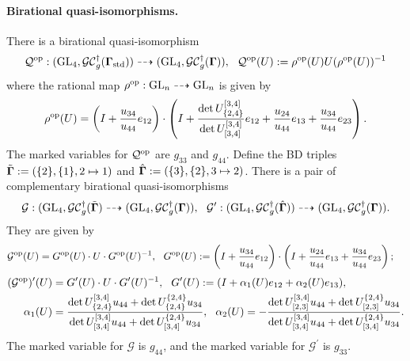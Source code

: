 \paragraph{Birational quasi-isomorphisms.} There is a birational quasi-isomorphism
\begin{equation}
    \mathcal{Q}^{\mathrm{op}}: (\operatorname{GL}_4,\mathcal{GC}_g^{\dagger}(\mathbf{\Gamma}_{\text{std}})) \dashrightarrow (\operatorname{GL}_4,\mathcal{GC}_g^{\dagger}(\mathbf{\Gamma})), \ \ \mathcal{Q}^{\mathrm{op}}(U):=\rho^{\mathrm{op}}(U)U (\rho^{\mathrm{op}}(U))^{-1}
\end{equation}
where the rational map $\rho^{\mathrm{op}}:\operatorname{GL}_n \dashrightarrow \operatorname{GL}_n$ is given by
\begin{equation}
    \rho^{\mathrm{op}}(U) = \left(I+\frac{u_{34}}{u_{44}}e_{12}\right)\cdot \left(I + \frac{\det U_{\{2,4\}}^{[3,4]}}{\det U^{[3,4]}_{[3,4]}}e_{12} + \frac{u_{24}}{u_{44}}e_{13} + \frac{u_{34}}{u_{44}}e_{23}\right).
\end{equation}
The marked variables for $\mathcal{Q}^{\mathrm{op}}$ are $g_{33}$ and $g_{44}$. Define the BD triples $\tilde{\mathbf{\Gamma}}:=(\{2\},\{1\},2\mapsto 1)$ and $\hat{\mathbf{\Gamma}}:=(\{3\},\{2\},3\mapsto 2)$. There is a pair of complementary birational quasi-isomorphisms 
\begin{equation}\mathcal{G}:(\GL_4,\gc_g^{\dagger}(\tilde{\bg})\dashrightarrow (\GL_4,\gc_g^{\dagger}(\bg)), \ \ \mathcal{G}^\prime:(\GL_4,\gc_g^{\dagger}(\hat{\bg})) \dashrightarrow (\GL_4,\gc_g^{\dagger}(\bg)).
\end{equation}
They are given by
\begin{align}
    \mathcal{G}^{\mathrm{op}}(U) &= G^{\mathrm{op}}(U)\cdot U \cdot G^{\mathrm{op}}(U)^{-1}, \ \ G^{\mathrm{op}}(U) := \left(I+\frac{u_{34}}{u_{44}}e_{12}\right)\cdot \left(I+\frac{u_{24}}{u_{44}}e_{13} + \frac{u_{34}}{u_{44}}e_{23}\right);
    \end{align}
    \begin{align}
   (\mathcal{G}^{\mathrm{op}})^\prime(U) &= G^\prime(U)\cdot U \cdot G^{\prime}(U)^{-1}, \ \ G^{\prime}(U) := (I+\alpha_1(U) e_{12} + \alpha_2(U) e_{13}),\\
    \alpha_1(U) &= \frac{\det U^{[3,4]}_{\{2,4\}}u_{44} + \det U_{\{2,4\}}^{\{2,4\}}u_{34}}{\det U^{[3,4]}_{[3,4]}u_{44} + \det U_{[3,4]}^{\{2,4\}}u_{34}}, \ \ \alpha_2(U) = -\frac{\det U^{[3,4]}_{[2,3]}u_{44} + \det U_{[2,3]}^{\{2,4\}}u_{34}}{\det U^{[3,4]}_{[3,4]}u_{44} + \det U_{[3,4]}^{\{2,4\}}u_{34}}.
\end{align}
The marked variable for $\mathcal{G}$ is $g_{44}$, and the marked variable for $\mathcal{G}^\prime$ is $g_{33}$.

